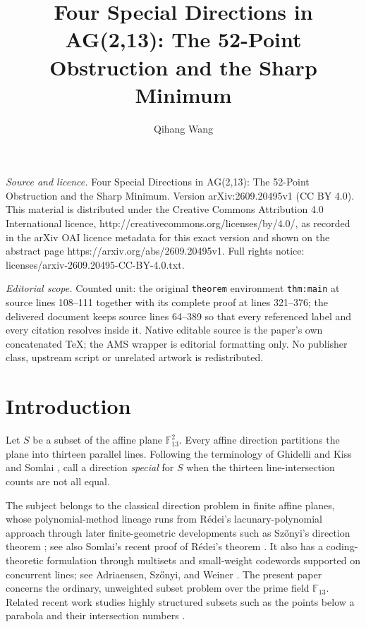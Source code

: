 \documentclass[10pt,a4paper]{amsart}
\newcommand{\F}{\mathbb F}
\begin{document}
\title[Four Special Directions in AG(2,13): The 52-Point Obstructio]{Four Special Directions in AG(2,13): The 52-Point Obstruction and the Sharp Minimum}
\author{Qihang Wang}
\date{}
\maketitle
\noindent\emph{Source and licence.} Four Special Directions in AG(2,13): The 52-Point Obstruction and the Sharp Minimum. Version arXiv:2609.20495v1 (CC BY 4.0). This material is distributed under the Creative Commons Attribution 4.0 International licence, http://creativecommons.org/licenses/by/4.0/, as recorded in the arXiv OAI licence metadata for this exact version and shown on the abstract page https://arxiv.org/abs/2609.20495v1. Full rights notice: licenses/arxiv-2609.20495-CC-BY-4.0.txt.\par\smallskip
\noindent\textit{Editorial scope.} Counted unit: the original \texttt{theorem} environment \texttt{thm:main} at source lines 108--111 together with its complete proof at lines 321--376; the delivered document keeps source lines 64--389 so that every referenced label and every citation resolves inside it. Native editable source is the paper's own concatenated TeX; the AMS wrapper is editorial formatting only. No publisher class, upstream script or unrelated artwork is redistributed.
\section{Introduction}

Let $S$ be a subset of the affine plane $\F_{13}^{2}$.  Every affine
direction partitions the plane into thirteen parallel lines.  Following the
terminology of Ghidelli \cite{GhidelliRichPoor} and Kiss and Somlai
\cite{KissSomlaiSpecialDirections}, call a direction \emph{special} for $S$
when the thirteen line-intersection counts are not all equal.

The subject belongs to the classical direction problem in finite affine
planes, whose polynomial-method lineage runs from R\'edei's lacunary-polynomial
approach \cite{RedeiLacunary} through later finite-geometric developments such
as Sz\H{o}nyi's direction theorem \cite{SzonyiDirections}; see also Somlai's
recent proof of R\'edei's theorem \cite{SomlaiRedei}.  It also has a
coding-theoretic formulation through multisets and small-weight codewords
supported on concurrent lines; see Adriaensen, Sz\H{o}nyi, and Weiner
\cite{AdriaensenSzonyiWeiner}.  The present paper concerns the ordinary,
unweighted subset problem over the prime field $\F_{13}$.  Related recent
work studies highly structured subsets such as the points below a parabola
and their intersection numbers
\cite{AdriaensenWeinerParabola}.
\end{document}
